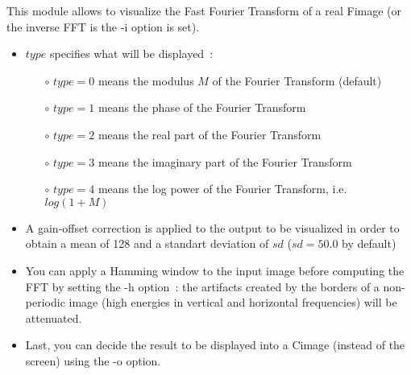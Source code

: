 This module allows to visualize the Fast Fourier Transform
of a real Fimage (or the inverse FFT is the -i option is set).
\begin{itemize}
\item $type$ specifies what will be displayed~:
\begin{itemize}
\item[$\circ$] $type=0$ means the modulus $M$ of the Fourier Transform (default)
\item[$\circ$] $type=1$ means the phase of the Fourier Transform
\item[$\circ$] $type=2$ means the real part of the Fourier Transform
\item[$\circ$] $type=3$ means the imaginary part of the Fourier Transform
\item[$\circ$] $type=4$ means the log power of the Fourier Transform, i.e. $log(1+M)$
\end{itemize}
\item A gain-offset correction is applied to the output to be visualized
in order to obtain a mean of 128 and a standart deviation of $sd$ 
($sd = 50.0$ by default)
\item You can apply a Hamming window to the input image before computing the
FFT by setting the -h option~: the artifacts created by the borders of a
non-periodic image (high energies in vertical and horizontal frequencies)
will be attenuated.
\item Last, you can decide the result to be displayed into a Cimage (instead 
of the screen) using the -o option.
\end{itemize}
